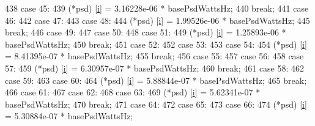 \begin{DoxyCode}
438                   \textcolor{keywordflow}{case} 45:
439                     (*psd) [\hyperlink{bernuolliDistribution_8m_a6f6ccfcf58b31cb6412107d9d5281426}{i}] = 3.16228e-06 * basePsdWattsHz;
440                     \textcolor{keywordflow}{break};
441                   \textcolor{keywordflow}{case} 46:
442                   \textcolor{keywordflow}{case} 47:
443                   \textcolor{keywordflow}{case} 48:
444                     (*psd) [\hyperlink{bernuolliDistribution_8m_a6f6ccfcf58b31cb6412107d9d5281426}{i}] = 1.99526e-06 * basePsdWattsHz;
445                     \textcolor{keywordflow}{break};
446                   \textcolor{keywordflow}{case} 49:
447                   \textcolor{keywordflow}{case} 50:
448                   \textcolor{keywordflow}{case} 51:
449                     (*psd) [\hyperlink{bernuolliDistribution_8m_a6f6ccfcf58b31cb6412107d9d5281426}{i}] = 1.25893e-06 * basePsdWattsHz;
450                     \textcolor{keywordflow}{break};
451                   \textcolor{keywordflow}{case} 52:
452                   \textcolor{keywordflow}{case} 53:
453                   \textcolor{keywordflow}{case} 54:
454                     (*psd) [\hyperlink{bernuolliDistribution_8m_a6f6ccfcf58b31cb6412107d9d5281426}{i}] = 8.41395e-07 * basePsdWattsHz;
455                     \textcolor{keywordflow}{break};
456                   \textcolor{keywordflow}{case} 55:
457                   \textcolor{keywordflow}{case} 56:
458                   \textcolor{keywordflow}{case} 57:
459                     (*psd) [\hyperlink{bernuolliDistribution_8m_a6f6ccfcf58b31cb6412107d9d5281426}{i}] = 6.30957e-07 * basePsdWattsHz;
460                     \textcolor{keywordflow}{break};
461                   \textcolor{keywordflow}{case} 58:
462                   \textcolor{keywordflow}{case} 59:
463                   \textcolor{keywordflow}{case} 60:
464                     (*psd) [\hyperlink{bernuolliDistribution_8m_a6f6ccfcf58b31cb6412107d9d5281426}{i}] = 5.88844e-07 * basePsdWattsHz;
465                     \textcolor{keywordflow}{break};
466                   \textcolor{keywordflow}{case} 61:
467                   \textcolor{keywordflow}{case} 62:
468                   \textcolor{keywordflow}{case} 63:
469                     (*psd) [\hyperlink{bernuolliDistribution_8m_a6f6ccfcf58b31cb6412107d9d5281426}{i}] = 5.62341e-07 * basePsdWattsHz;
470                     \textcolor{keywordflow}{break};
471                   \textcolor{keywordflow}{case} 64:
472                   \textcolor{keywordflow}{case} 65:
473                   \textcolor{keywordflow}{case} 66:
474                     (*psd) [\hyperlink{bernuolliDistribution_8m_a6f6ccfcf58b31cb6412107d9d5281426}{i}] = 5.30884e-07 * basePsdWattsHz;

\end{DoxyCode}
